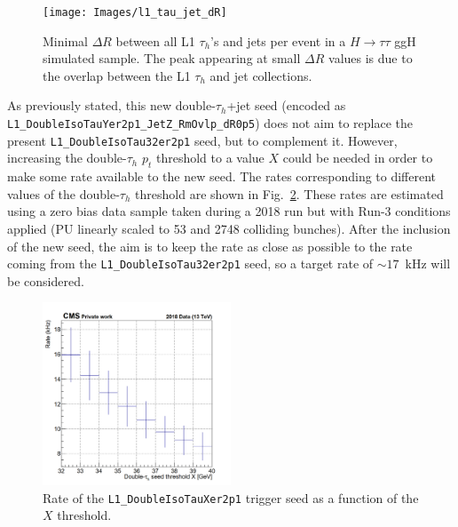 \documentclass[../main.tex]{subfiles}
\begin{document}
\begin{figure}[h!]
\begin{center}
\texttt{[image: Images/l1\_tau\_jet\_dR]}
\end{center}
\caption{Minimal $\Delta R$ between all L1 $\tau_h$'s and jets per event in a $H\to\tau\tau$ ggH simulated sample. The peak appearing at small $\Delta R$ values is due to the overlap between the L1 $\tau_h$ and jet collections.}
\label{hh:fig:l1_tau_jet_dR}
\end{figure}

As previously stated, this new double-$\tau_h$+jet seed (encoded as \texttt{L1\_Double\-IsoTauY\-er2p1\-\_JetZ\_RmOvlp\_dR0p5}) does not aim to replace the present \texttt{L1\_Double\-Iso\-Tau32er2p1} seed, but to complement it. However, increasing the double-$\tau_h$ $p_t$ threshold to a value $X$ could be needed in order to make some rate available to the new seed. The rates corresponding to different values of the double-$\tau_h$ threshold are shown in Fig.~\ref{hh:fig:trig_ditau32_rate}. These rates are estimated using a zero bias data sample taken during a 2018 run but with Run-3 conditions applied (PU linearly scaled to 53 and 2748 colliding bunches). After the inclusion of the new seed, the aim is to keep the rate as close as possible to the rate coming from the \texttt{L1\_Double\-Iso\-Tau32er2p1} seed, so a target rate of $\sim17$~kHz will be considered.

\begin{figure}[h!]
\begin{center}
\includegraphics[width=0.5\textwidth]{Images/plot2D_ditau_sym_323755}
\end{center}
\caption{Rate of the \texttt{L1\_DoubleIsoTauXer2p1} trigger seed as a function of the $X$ threshold.}
\label{hh:fig:trig_ditau32_rate}
\end{figure}
\end{document}
